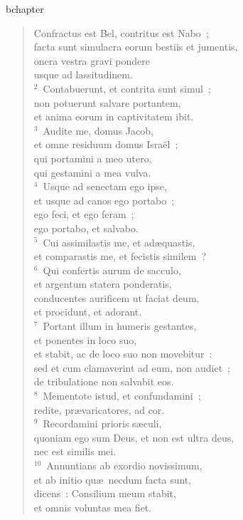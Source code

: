 bchapter\begin{verse}\vspace{-19pt}Confractus est Bel, contritus est Nabo~;\\ facta sunt simulacra eorum bestiis et jumentis,\\ onera vestra gravi pondere\\ usque ad lassitudinem.\\
${}^{2}$~Contabuerunt, et contrita sunt simul~;\\ non potuerunt salvare portantem,\\ et anima eorum in captivitatem ibit.\\
${}^{3}$~Audite me, domus Jacob,\\ et omne residuum domus Isra\"el~;\\ qui portamini a meo utero,\\ qui gestamini a mea vulva.\\
${}^{4}$~Usque ad senectam ego ipse,\\ et usque ad canos ego portabo~;\\ ego feci, et ego feram~;\\ ego portabo, et salvabo.\\
${}^{5}$~Cui assimilastis me, et ad\ae quastis,\\ et comparastis me, et fecistis similem~?\\
${}^{6}$~Qui confertis aurum de sacculo,\\ et argentum statera ponderatis,\\ conducentes aurificem ut faciat deum,\\ et procidunt, et adorant.\\
${}^{7}$~Portant illum in humeris gestantes,\\ et ponentes in loco suo,\\ et stabit, ac de loco suo non movebitur~:\\ sed et cum clamaverint ad eum, non audiet~;\\ de tribulatione non salvabit eos.\\
${}^{8}$~Mementote istud, et confundamini~;\\ redite, pr\ae varicatores, ad cor.\\
${}^{9}$~Recordamini prioris s\ae culi,\\ quoniam ego sum Deus, et non est ultra deus,\\ nec est similis mei.\\
${}^{10}$~Annuntians ab exordio novissimum,\\ et ab initio qu\ae\ necdum facta sunt,\\ dicens~: Consilium meum stabit,\\ et omnis voluntas mea fiet.\\

\end{verse}
